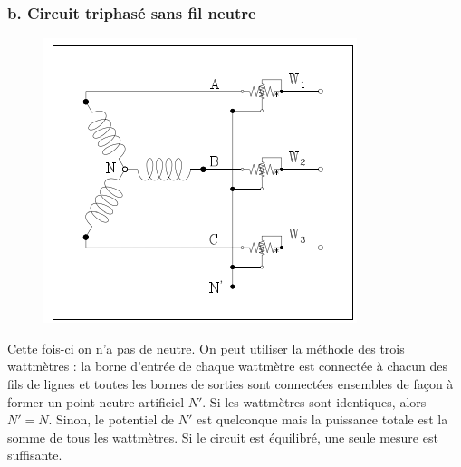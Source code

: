 \subsubsection{b. Circuit triphasé sans fil neutre}
\begin{figure}
	\vspace{-5mm}
	\includegraphics[scale=0.35]{ch1/image13.png}
\end{figure}		
Cette fois-ci on n'a pas de neutre. On peut utiliser la méthode des 
trois wattmètres : la borne d'entrée de chaque wattmètre est connectée 
à chacun des fils de lignes et toutes les bornes de sorties sont 
connectées ensembles de façon à former un point neutre artificiel $N'$. 
Si les wattmètres sont identiques, alors $N'=N$. Sinon, le potentiel 
de $N'$ est quelconque mais la puissance totale est la somme de tous 
les wattmètres. Si le circuit est équilibré, une seule mesure est 
suffisante.\\
		
				
		
